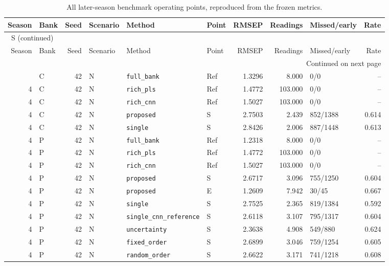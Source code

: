 \documentclass[10pt,a4paper]{article}
\renewcommand{\thetable}{S\arabic{table}}
\begin{document}
\begingroup\footnotesize
\setlength{\tabcolsep}{3.5pt}
\renewcommand{\arraystretch}{1.10}
\begin{longtable}{rlrlllrrlr}
\caption{All later-season benchmark operating points, reproduced from the frozen metrics.}\label{tab:original}\\
\toprule
Season & Bank & Seed & Scenario & Method & Point & RMSEP & Readings & Missed/early & Rate \\
\midrule
\endfirsthead
\multicolumn{10}{l}{\tablename~\thetable{} (continued)}\\
\toprule
Season & Bank & Seed & Scenario & Method & Point & RMSEP & Readings & Missed/early & Rate \\
\midrule
\endhead
\midrule
\multicolumn{10}{r}{Continued on next page}\\
\endfoot
\bottomrule
\endlastfoot
4 & C & 42 & N & \texttt{full\_bank} & Ref & 1.3296 & 8.000 & 0/0 & -- \\
4 & C & 42 & N & \texttt{rich\_pls} & Ref & 1.4772 & 103.000 & 0/0 & -- \\
4 & C & 42 & N & \texttt{rich\_cnn} & Ref & 1.5027 & 103.000 & 0/0 & -- \\
4 & C & 42 & N & \texttt{proposed} & S & 2.7503 & 2.439 & 852/1388 & 0.614 \\
4 & C & 42 & N & \texttt{single} & S & 2.8426 & 2.006 & 887/1448 & 0.613 \\
4 & P & 42 & N & \texttt{full\_bank} & Ref & 1.2318 & 8.000 & 0/0 & -- \\
4 & P & 42 & N & \texttt{rich\_pls} & Ref & 1.4772 & 103.000 & 0/0 & -- \\
4 & P & 42 & N & \texttt{rich\_cnn} & Ref & 1.5027 & 103.000 & 0/0 & -- \\
4 & P & 42 & N & \texttt{proposed} & S & 2.6717 & 3.096 & 755/1250 & 0.604 \\
4 & P & 42 & N & \texttt{proposed} & E & 1.2609 & 7.942 & 30/45 & 0.667 \\
4 & P & 42 & N & \texttt{single} & S & 2.7525 & 2.365 & 819/1384 & 0.592 \\
4 & P & 42 & N & \texttt{single\_cnn\_reference} & S & 2.6118 & 3.107 & 795/1317 & 0.604 \\
4 & P & 42 & N & \texttt{uncertainty} & S & 2.3638 & 4.908 & 549/880 & 0.624 \\
4 & P & 42 & N & \texttt{fixed\_order} & S & 2.6899 & 3.046 & 759/1254 & 0.605 \\
4 & P & 42 & N & \texttt{random\_order} & S & 2.6622 & 3.171 & 741/1218 & 0.608 \\

\end{longtable}
\end{document}
